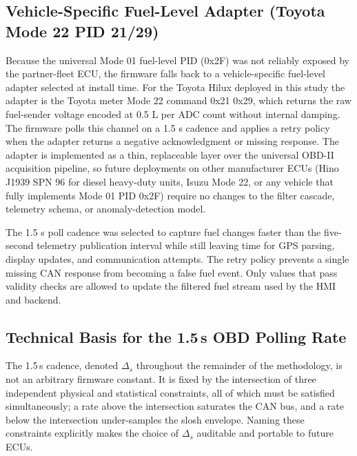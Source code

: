 \subsection{Vehicle-Specific Fuel-Level Adapter (Toyota Mode 22 PID 21/29)}
\label{sec:fuel_level_adapter}
Because the universal Mode 01 fuel-level PID (0x2F) was not reliably exposed by the partner-fleet ECU, the firmware falls back to a vehicle-specific fuel-level adapter selected at install time. For the Toyota Hilux deployed in this study the adapter is the Toyota meter Mode 22 command 0x21 0x29, which returns the raw fuel-sender voltage encoded at 0.5 L per ADC count without internal damping. The firmware polls this channel on a 1.5 s cadence and applies a retry policy when the adapter returns a negative acknowledgment or missing response. The adapter is implemented as a thin, replaceable layer over the universal OBD-II acquisition pipeline, so future deployments on other manufacturer ECUs (Hino J1939 SPN 96 for diesel heavy-duty units, Isuzu Mode 22, or any vehicle that fully implements Mode 01 PID 0x2F) require no changes to the filter cascade, telemetry schema, or anomaly-detection model.

The 1.5 s poll cadence was selected to capture fuel changes faster than the five-second telemetry publication interval while still leaving time for GPS parsing, display updates, and communication attempts. The retry policy prevents a single missing CAN response from becoming a false fuel event. Only values that pass validity checks are allowed to update the filtered fuel stream used by the HMI and backend.

\subsection{Technical Basis for the 1.5\,s OBD Polling Rate}
\label{sec:obd_poll_justification}

The 1.5\,s cadence, denoted $\Delta_s$ throughout the remainder of the methodology, is not an arbitrary firmware constant. It is fixed by the intersection of three independent physical and statistical constraints, all of which must be satisfied simultaneously; a rate above the intersection saturates the CAN bus, and a rate below the intersection under-samples the slosh envelope. Naming these constraints explicitly makes the choice of $\Delta_s$ auditable and portable to future ECUs.

